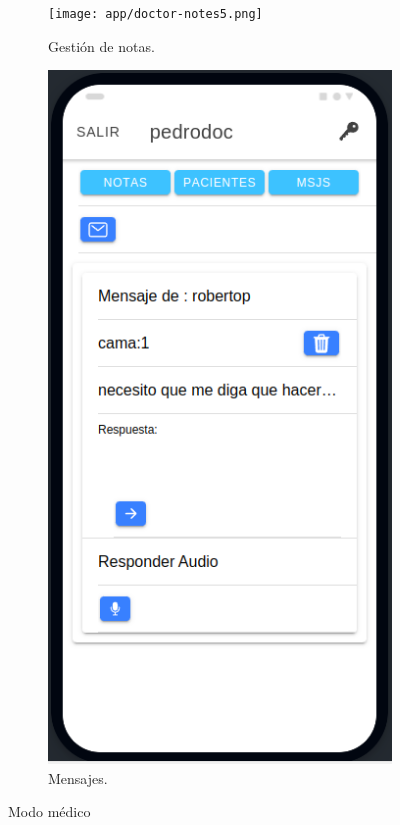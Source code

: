 \begin{figure}[!htpb]
\begin{subfigure}[b]{0.3\textwidth}
     \end{subfigure}
     \hfill
     \begin{subfigure}[b]{0.3\textwidth}
         \centering
         \texttt{[image: app/doctor-notes5.png]}
         \caption{Gestión de notas.}
         \label{fig_1:2de3}
     \end{subfigure}
     \hfill
     \begin{subfigure}[b]{0.3\textwidth}
         \centering
         \includegraphics[width=.95\textwidth]{./Figures/app/doctor-message-audio.png}
         \caption{Mensajes.}
         \label{fig_1:3de3}
     \end{subfigure}
        \caption{Modo médico}
        \label{fig:Modo médico}
\end{figure}

